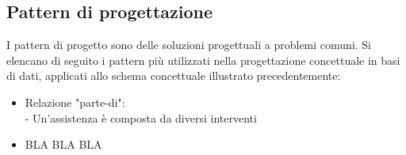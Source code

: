 \documentclass[legalpaper]{article}
\begin{document}
\subsection{Pattern di progettazione}
I pattern di progetto sono delle soluzioni progettuali a problemi comuni. Si elencano di seguito i pattern più utilizzati nella progettazione concettuale in basi di dati, applicati allo schema concettuale illustrato precedentemente:
\begin{itemize}
	\item Relazione "parte-di":\\
	- Un'assistenza è composta da diversi interventi
	
	\item BLA BLA BLA
	

\end{itemize}
	

\newpage
\end{document}
